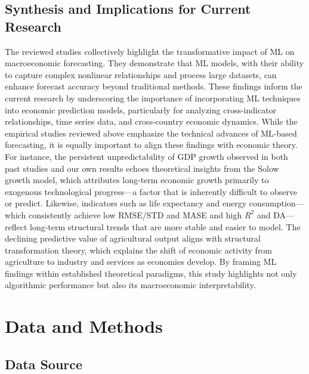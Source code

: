 \documentclass[12pt]{article}
\begin{document}
\subsection{Synthesis and Implications for Current Research}

The reviewed studies collectively highlight the transformative impact of ML on macroeconomic forecasting. They demonstrate that ML models, with their ability to capture complex nonlinear relationships and process large datasets, can enhance forecast accuracy beyond traditional methods. These findings inform the current research by underscoring the importance of incorporating ML techniques into economic prediction models, particularly for analyzing cross-indicator relationships, time series data, and cross-country economic dynamics.
While the empirical studies reviewed above emphasize the technical advances of ML-based forecasting, it is equally important to align these findings with economic theory. For instance, the persistent unpredictability of GDP growth observed in both past studies and our own results echoes theoretical insights from the Solow growth model\cite{Solow1956}, which attributes long-term economic growth primarily to exogenous technological progress—a factor that is inherently difficult to observe or predict. Likewise, indicators such as life expectancy and energy consumption—which consistently achieve low RMSE/STD and MASE and high $R^2$ and DA—reflect long-term structural trends that are more stable and easier to model. The declining predictive value of agricultural output aligns with structural transformation theory, which explains the shift of economic activity from agriculture to industry and services as economies develop. By framing ML findings within established theoretical paradigms, this study highlights not only algorithmic performance but also its macroeconomic interpretability.\cite{Solow1956, Kuznets1971}

\section{Data and Methods}

\subsection{Data Source}
\end{document}
